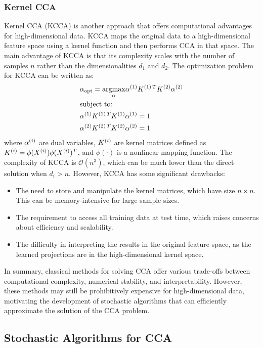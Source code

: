\subsubsection{Kernel CCA}
Kernel CCA (KCCA) is another approach that offers computational advantages for high-dimensional data. KCCA maps the original data to a high-dimensional feature space using a kernel function and then performs CCA in that space. The main advantage of KCCA is that its complexity scales with the number of samples $n$ rather than the dimensionalities $d_1$ and $d_2$.
The optimization problem for KCCA can be written as:
\begin{align}
& \alpha_{\text{opt}} = \underset{\alpha}{\mathrm{argmax}} { \alpha^{(1)} K^{(1)\,T} K^{(2)} \alpha^{(2)} } \\
& \text{subject to:} \notag \\
& \alpha^{(1)} K^{(1)\,T} K^{(1)} \alpha^{(1)} = 1 \notag \\
& \alpha^{(2)} K^{(2)\,T} K^{(2)} \alpha^{(2)} = 1 \notag
\end{align}
where $\alpha^{(i)}$ are dual variables, $K^{(i)}$ are kernel matrices defined as $K^{(i)} = \phi(X^{(i)})\phi(X^{(i)})^T$, and $\phi(\cdot)$ is a nonlinear mapping function.
The complexity of KCCA is $\mathcal{O}(n^3)$, which can be much lower than the direct solution when $d_i > n$. However, KCCA has some significant drawbacks:
\begin{itemize}
    \item The need to store and manipulate the kernel matrices, which have size $n \times n$. This can be memory-intensive for large sample sizes.
    \item The requirement to access all training data at test time, which raises concerns about efficiency and scalability.
    \item The difficulty in interpreting the results in the original feature space, as the learned projections are in the high-dimensional kernel space.
\end{itemize}

In summary, classical methods for solving CCA offer various trade-offs between computational complexity, numerical stability, and interpretability. However, these methods may still be prohibitively expensive for high-dimensional data, motivating the development of stochastic algorithms that can efficiently approximate the solution of the CCA problem.

\subsection{Stochastic Algorithms for CCA}

